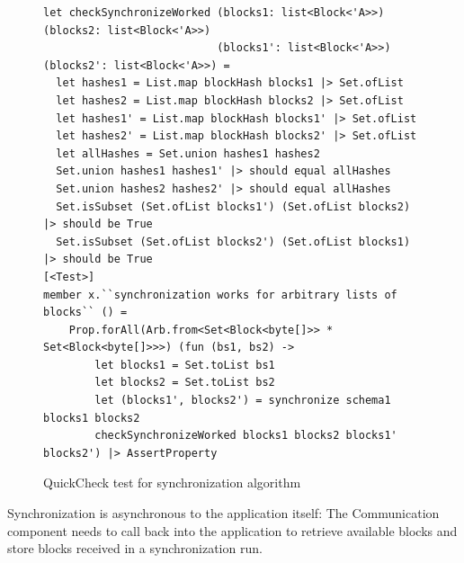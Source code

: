 \documentclass[sigplan,review]{acmart}
\begin{document}
\begin{figure}[tb]
  \centering
\begin{verbatim}
let checkSynchronizeWorked (blocks1: list<Block<'A>>) (blocks2: list<Block<'A>>)
                           (blocks1': list<Block<'A>>) (blocks2': list<Block<'A>>) =
  let hashes1 = List.map blockHash blocks1 |> Set.ofList
  let hashes2 = List.map blockHash blocks2 |> Set.ofList
  let hashes1' = List.map blockHash blocks1' |> Set.ofList
  let hashes2' = List.map blockHash blocks2' |> Set.ofList
  let allHashes = Set.union hashes1 hashes2
  Set.union hashes1 hashes1' |> should equal allHashes
  Set.union hashes2 hashes2' |> should equal allHashes
  Set.isSubset (Set.ofList blocks1') (Set.ofList blocks2) |> should be True
  Set.isSubset (Set.ofList blocks2') (Set.ofList blocks1) |> should be True
[<Test>]
member x.``synchronization works for arbitrary lists of blocks`` () =
    Prop.forAll(Arb.from<Set<Block<byte[]>> * Set<Block<byte[]>>>) (fun (bs1, bs2) ->
        let blocks1 = Set.toList bs1
        let blocks2 = Set.toList bs2
        let (blocks1', blocks2') = synchronize schema1 blocks1 blocks2
        checkSynchronizeWorked blocks1 blocks2 blocks1' blocks2') |> AssertProperty
\end{verbatim}
  \caption{QuickCheck test for synchronization algorithm}
  \label{fig:sync-quickcheck}
\end{figure}
%
Synchronization is asynchronous to the application itself: The
Communication component needs to call back into the application to
retrieve available blocks and store blocks received in a
synchronization run.


\end{document}

